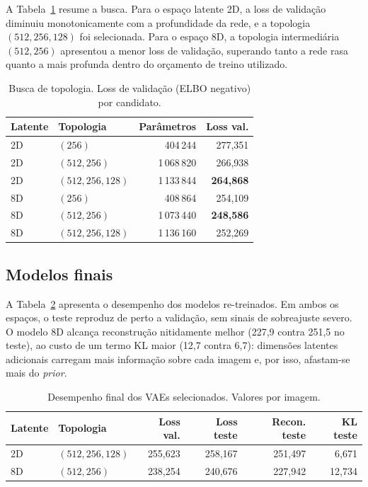 \documentclass[11pt,a4paper]{article}
\begin{document}
A Tabela~\ref{tab:search} resume a busca. Para o espaço latente 2D, a loss de
validação diminuiu monotonicamente com a profundidade da rede, e a topologia
$(512,256,128)$ foi selecionada. Para o espaço 8D, a topologia intermediária
$(512,256)$ apresentou a menor loss de validação, superando tanto a rede rasa
quanto a mais profunda dentro do orçamento de treino utilizado.

\begin{table}[H]
\centering
\small
\caption{Busca de topologia. Loss de validação (ELBO negativo) por candidato.}
\label{tab:search}
\begin{tabular}{llrr}
\toprule
\textbf{Latente} & \textbf{Topologia} & \textbf{Parâmetros} & \textbf{Loss val.} \\
\midrule
2D & $(256)$          & 404\,244    & 277,351 \\
2D & $(512,256)$      & 1\,068\,820 & 266,938 \\
2D & $(512,256,128)$  & 1\,133\,844 & \textbf{264,868} \\
\midrule
8D & $(256)$          & 408\,864    & 254,109 \\
8D & $(512,256)$      & 1\,073\,440 & \textbf{248,586} \\
8D & $(512,256,128)$  & 1\,136\,160 & 252,269 \\
\bottomrule
\end{tabular}
\end{table}

\subsection{Modelos finais}

A Tabela~\ref{tab:final} apresenta o desempenho dos modelos re-treinados. Em
ambos os espaços, o teste reproduz de perto a validação, sem sinais de
sobreajuste severo. O modelo 8D alcança reconstrução nitidamente melhor
(227,9 contra 251,5 no teste), ao custo de um termo KL maior (12,7 contra 6,7):
dimensões latentes adicionais carregam mais informação sobre cada imagem e, por
isso, afastam-se mais do \textit{prior}.

\begin{table}[H]
\centering
\small
\caption{Desempenho final dos VAEs selecionados. Valores por imagem.}
\label{tab:final}
\begin{tabular}{llrrrr}
\toprule
\textbf{Latente} & \textbf{Topologia} & \textbf{Loss val.} &
\textbf{Loss teste} & \textbf{Recon. teste} & \textbf{KL teste} \\
\midrule
2D & $(512,256,128)$ & 255,623 & 258,167 & 251,497 & 6,671 \\
8D & $(512,256)$     & 238,254 & 240,676 & 227,942 & 12,734 \\
\bottomrule
\end{tabular}
\end{table}
\end{document}
